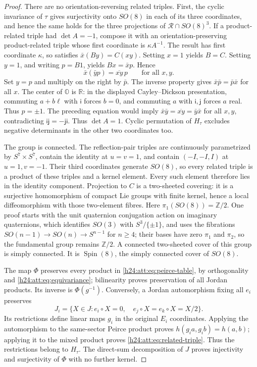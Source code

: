 \begin{proof}
There are no orientation-reversing related triples. First, the cyclic
invariance of $\tau$ gives surjectivity onto $SO(8)$ in each of its
three coordinates, and hence the same holds for the three projections
of $\mathcal R\cap SO(8)^3$. If a product-related triple had
$\det A=-1$, compose it with an orientation-preserving product-related
triple whose first coordinate is $\kappa A^{-1}$. The result has first
coordinate $\kappa$, so satisfies $\bar x(By)=C(xy)$.
Setting $x=1$ yields $B=C$. Setting $y=1$, and writing $p=B1$, yields
$Bx=\bar x p$. Hence
\[
 \bar x(\bar y p)=\overline{xy}\,p\qquad\text{for all }x,y.
\]
Set $y=p$ and multiply on the right by $\bar p$. The inverse property
gives $\bar x\bar p=\bar p\bar x$ for all $x$. The center of
$\mathbb O$ is $\mathbb R$: in the displayed Cayley--Dickson
presentation, commuting $a+b\ell$ with $\mathsf i$ forces $b=0$,
and commuting $a$ with $\mathsf i,\mathsf j$ forces $a$ real.
Thus $p=\pm1$. The preceding equation would imply
$\bar x\bar y=\overline{xy}=\bar y\bar x$ for all $x,y$,
contradicting $\mathsf i\mathsf j=-\mathsf j\mathsf i$.
Thus $\det A=1$. Cyclic permutation of $H_\tau$ excludes negative
determinants in the other two coordinates too.

The group is connected. The reflection-pair triples are continuously
parametrized by $S^7\times S^7$, contain the identity at $u=v=1$,
and contain $(-I,-I,I)$ at $u=1,v=-1$. Their third coordinates
generate $SO(8)$, so every related triple is a product of these
triples and a kernel element. Every such element therefore lies in
the identity component. Projection to $C$ is a two-sheeted covering:
it is a surjective homomorphism of compact Lie groups with finite
kernel, hence a local diffeomorphism with those two-element fibres.
Here $\pi_1(SO(8))=\mathbb Z/2$. One proof starts with the unit
quaternion conjugation action on imaginary quaternions, which
identifies $SO(3)$ with $S^3/\{\pm1\}$, and uses the fibrations
$SO(n-1)\to SO(n)\to S^{n-1}$ for $n\ge4$; their bases have zero
$\pi_1$ and $\pi_2$, so the fundamental group remains $\mathbb Z/2$.
A connected two-sheeted cover of this group is simply connected.
It is $\operatorname{Spin}(8)$, the simply connected cover of $SO(8)$.

The map $\Phi$ preserves every product in
\eqref{h24:att:eq:peirce-table}, by orthogonality and
\eqref{h24:att:eq:equivariance}; bilinearity proves preservation of all
Jordan products. Its inverse is $\Phi(g^{-1})$. Conversely, a Jordan
automorphism fixing all $e_i$ preserves
\[
 J_i=\{X\in J:e_i\circ X=0,\quad e_j\circ X=e_k\circ X=X/2\}.
\]
Its restrictions define linear maps $g_i$ in the original $E_i$
coordinates. Applying the automorphism to the same-sector Peirce
product proves $h(g_i a,g_i b)=h(a,b)$; applying it to the mixed
product proves \eqref{h24:att:eq:related-triple}. Thus the restrictions
belong to $H_\tau$. The direct-sum decomposition of $J$ proves
injectivity and surjectivity of $\Phi$ with no further kernel.
\end{proof}

